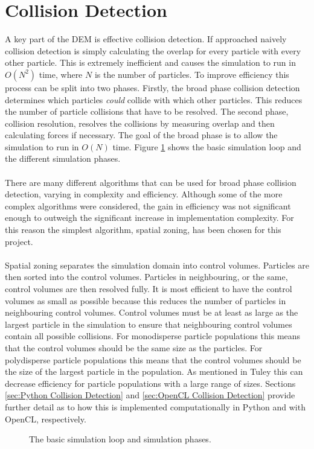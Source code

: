 \documentclass[a4paper,11pt,titlepage]{report}
\begin{document}
\section{Collision Detection}
\label{sec:collision detection}
A key part of the DEM is effective collision detection. If approached naively collision detection is simply calculating the overlap for every particle with every other particle. This is extremely inefficient and causes the simulation to run in $O(N^2)$ time, where $N$ is the number of particles. To improve efficiency this process can be split into two phases. Firstly, the broad phase collision detection determines which particles \textit{could} collide with which other particles. This reduces the number of particle collisions that have to be resolved. The second phase, collision resolution, resolves the collisions by measuring overlap and then calculating forces if necessary. The goal of the broad phase is to allow the simulation to run in $O(N)$ time. Figure \ref{fig:algorithm_flowchart} shows the basic simulation loop and the different simulation phases.
\\\\There are many different algorithms that can be used for broad phase collision detection, varying in complexity and efficiency. Although some of the more complex algorithms were considered, the gain in efficiency was not significant enough to outweigh the significant increase in implementation complexity. For this reason the simplest algorithm, spatial zoning, has been chosen for this project.
\\\\Spatial zoning separates the simulation domain into control volumes. Particles are then sorted into the control volumes. Particles in neighbouring, or the same, control volumes are then resolved fully. It is most efficient to have the control volumes as small as possible because this reduces the number of particles in neighbouring control volumes. Control volumes must be at least as large as the largest particle in the simulation to ensure that neighbouring control volumes contain all possible collisions. For monodisperse particle populations this means that the control volumes should be the same size as the particles. For polydisperse particle populations this means that the control volumes should be the size of the largest particle in the population. As mentioned in Tuley\cite{tuley} this can decrease efficiency for particle populations with a large range of sizes. Sections \ref{sec:Python Collision Detection} and \ref{sec:OpenCL Collision Detection} provide further detail as to how this is implemented computationally in Python and with OpenCL, respectively.
\begin{figure}[!htb]
\centering

\caption{The basic simulation loop and simulation phases.}
\label{fig:algorithm_flowchart}
\end{figure}
\end{document}
